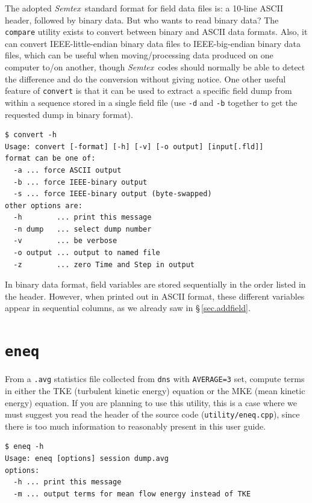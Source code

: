 \documentclass[11pt]{report}
\newcommand{\Semtex}{\emph{Semtex}} \newcommand{\Dog}{\emph{Dog}}
\begin{document}
The adopted \Semtex\ standard format for field data files is: a
10-line ASCII header, followed by binary data.  But who wants to read
binary data?  The \verb|compare| utility exists to convert between
binary and ASCII data formats.  Also, it can convert
IEEE-little-endian binary data files to IEEE-big-endian binary data
files, which can be useful when moving/processing data produced on one
computer to/on another, though \Semtex\ codes should normally be able
to detect the difference and do the conversion without giving notice.
One other useful feature of \verb|convert| is that it can be used to
extract a specific field dump from within a sequence stored in a
single field file (use \verb|-d| and \verb|-b| together to get the
requested dump in binary format).
{\small
\begin{verbatim}
$ convert -h
Usage: convert [-format] [-h] [-v] [-o output] [input[.fld]]
format can be one of:
  -a ... force ASCII output
  -b ... force IEEE-binary output
  -s ... force IEEE-binary output (byte-swapped)
other options are:
  -h        ... print this message
  -n dump   ... select dump number
  -v        ... be verbose
  -o output ... output to named file
  -z        ... zero Time and Step in output
\end{verbatim}
}
%
In binary data format, field variables are stored sequentially in the
order listed in the header.  However, when printed out in ASCII
format, these different variables appear in sequential columns, as we
already saw in \S\,\ref{sec.addfield}.

\section{\texttt{eneq}}
\label{sec.eneq}

From a \verb|.avg| statistics file collected from \verb|dns| with
\verb|AVERAGE=3| set, compute terms in either the TKE (turbulent
kinetic energy) equation or the MKE (mean kinetic energy) equation.
If you are planning to use this utility, this is a case where we must
suggest you read the header of the source code
(\verb|utility/eneq.cpp|), since there is too much information to
reasonably present in this user guide.
{\small
\begin{verbatim}
$ eneq -h
Usage: eneq [options] session dump.avg
options:
  -h ... print this message
  -m ... output terms for mean flow energy instead of TKE
\end{verbatim}
}
%
\end{document}
